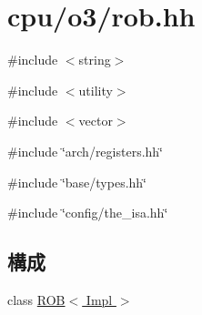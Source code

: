 \hypertarget{rob_8hh}{
\section{cpu/o3/rob.hh}
\label{rob_8hh}
}
{\ttfamily \#include $<$string$>$}\par
{\ttfamily \#include $<$utility$>$}\par
{\ttfamily \#include $<$vector$>$}\par
{\ttfamily \#include \char`\"{}arch/registers.hh\char`\"{}}\par
{\ttfamily \#include \char`\"{}base/types.hh\char`\"{}}\par
{\ttfamily \#include \char`\"{}config/the\_\-isa.hh\char`\"{}}\par
\subsection*{構成}
\begin{DoxyCompactItemize}
\item 
class \hyperlink{classROB}{ROB$<$ Impl $>$}
\end{DoxyCompactItemize}
